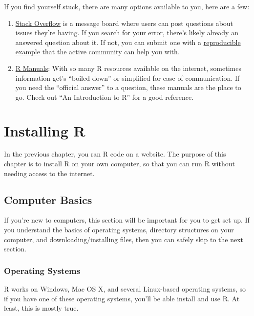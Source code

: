 \documentclass[
]{article}
\providecommand{\tightlist}{%
  \setlength{\itemsep}{0pt}\setlength{\parskip}{0pt}}
\begin{document}
If you find yourself stuck, there are many options available to you, here are a few:

\begin{enumerate}
\def\labelenumi{\arabic{enumi}.}
\tightlist
\item
  \href{https://stackoverflow.com}{Stack Overflow} is a message board where users can post questions about issues they're having. If you search for your error, there's likely already an answered question about it. If not, you can submit one with a \href{https://stackoverflow.com/questions/5963269/how-to-make-a-great-r-reproducible-example}{reproducible example} that the active community can help you with.
\item
  \href{https://cran.r-project.org/manuals.html}{R Manuals}: With so many R resources available on the internet, sometimes information get's ``boiled down'' or simplified for ease of communication. If you need the ``official answer'' to a question, these manuals are the place to go. Check out ``An Introduction to R'' for a good reference.
\end{enumerate}

\hypertarget{installingr}{%
\section{Installing R}\label{installingr}}

In the previous chapter, you ran R code on a website.
The purpose of this chapter is to install R on your own computer, so that you can run R without needing access to the internet.

\hypertarget{computer-basics}{%
\subsection{Computer Basics}\label{computer-basics}}

If you're new to computers, this section will be important for you to get set up.
If you understand the basics of operating systems, directory structures on your computer, and downloading/installing files, then you can safely skip to the next section.

\hypertarget{operating-systems}{%
\subsubsection{Operating Systems}\label{operating-systems}}

R works on Windows, Mac OS X, and several Linux-based operating systems, so if you have one of these operating systems, you'll be able install and use R.
At least, this is mostly true.
\end{document}
